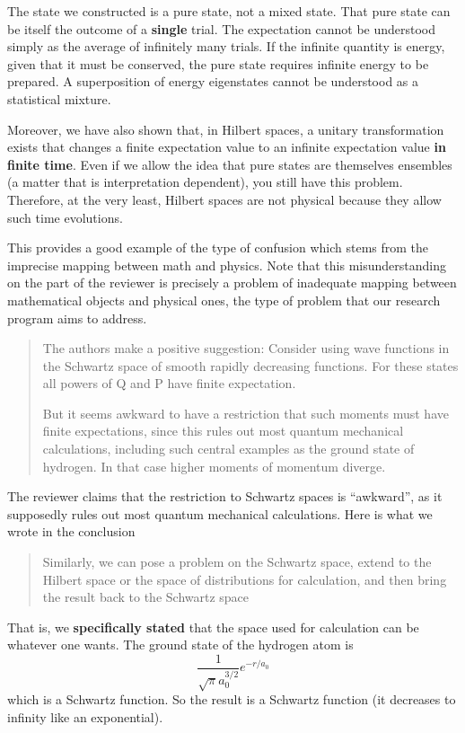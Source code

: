 \documentclass[11pt, executivepaper]{article}
\begin{document}
The state we constructed is a pure state, not a mixed state. That pure state can be itself the outcome of a \textbf{single} trial. The expectation cannot be understood simply as the average of infinitely many trials. If the infinite quantity is energy, given that it must be conserved, the pure state requires infinite energy to be prepared. A superposition of energy eigenstates cannot be understood as a statistical mixture.

Moreover, we have also shown that, in Hilbert spaces, a unitary transformation exists that changes a finite expectation value to an infinite expectation value \textbf{in finite time}. Even if we allow the idea that pure states are themselves ensembles (a matter that is interpretation dependent), you still have this problem. Therefore, at the very least, Hilbert spaces are not physical because they allow such time evolutions.

This provides a good example of the type of confusion which stems from the imprecise mapping between math and physics. Note that this misunderstanding on the part of the reviewer is precisely a problem of inadequate mapping between mathematical objects and physical ones, the type of problem that our research program aims to address. 

\begin{quote}
The authors make a positive suggestion: Consider using wave functions in
the Schwartz space of smooth rapidly decreasing functions. For these states all
powers of Q and P have finite expectation.

But it seems awkward to have a restriction that such moments must have
finite expectations, since this rules out most quantum mechanical calculations,
including such central examples as the ground state of hydrogen. In that case
higher moments of momentum diverge.
\end{quote}
The reviewer claims that the restriction to Schwartz spaces is ``awkward'', as it supposedly rules out most quantum mechanical calculations. Here is what we wrote in the conclusion
\begin{quote}
Similarly, we can pose a problem on the
Schwartz space, extend to the Hilbert space or the space
of distributions for calculation, and then bring the result
back to the Schwartz space
\end{quote}
That is, we \textbf{specifically stated} that the space used for calculation can be whatever one wants. The ground state of the hydrogen atom is
$$ \frac{1}{\sqrt{\pi} a_0^{3/2} }e^{-r/a_0} $$
which is a Schwartz function. So the result is a Schwartz function (it decreases to infinity like an exponential).
\end{document}
